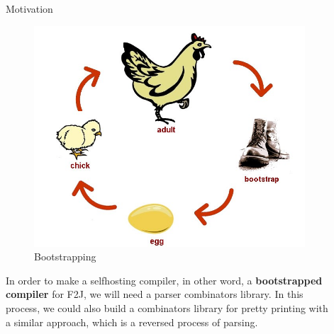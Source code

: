 \documentclass[final]{beamer}
\newlength{\sepwid}
\newlength{\onecolwid}
\newlength{\twocolwid}
\begin{document}
\begin{frame}[t]
\begin{columns}[t]
\begin{column}{\onecolwid}
\begin{block}{Motivation}
\begin{figure}
\includegraphics[width=0.9\linewidth]{img/bootstrapping.jpg}
\caption{Bootstrapping}
\end{figure}

In order to make a selfhosting compiler, in other word, a \textbf{bootstrapped compiler} for F2J, we will need a parser combinators library. In this process, we could also build a combinators library for pretty printing with a similar approach, which is a reversed process of parsing.

\end{block}




\end{column} %

\begin{column}{\sepwid}\end{column} %

\begin{column}{\twocolwid} %

\begin{columns}[t,totalwidth=\twocolwid] %

\begin{column}{\onecolwid}\vspace{-.6in} %


\end{column}
\end{columns}
\end{column}
\end{columns}
\end{frame}
\end{document}
